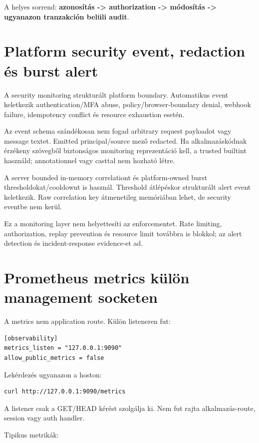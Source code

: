 A helyes sorrend: \textbf{azonosítás -> authorization -> módosítás -> ugyanazon tranzakción belüli audit}.

\section{Platform security event, redaction és burst alert}

A security monitoring strukturált platform boundary. Automatikus event keletkezik authentication/MFA abuse, policy/browser-boundary denial, webhook failure, idempotency conflict és resource exhaustion esetén.

Az event schema szándékosan nem fogad arbitrary request payloadot vagy message textet. Emitted principal/source mező redacted. Ha alkalmazáskódnak érzékeny szövegből biztonságos monitoring reprezentáció kell, a trusted  builtint használd;  annotationnel vagy casttal nem hozható létre.

A server bounded in-memory correlationt és platform-owned burst thresholdokat/cooldownt is használ. Threshold átlépéskor strukturált  alert event keletkezik. Raw correlation key átmenetileg memóriában lehet, de security eventbe nem kerül.

Ez a monitoring layer nem helyettesíti az enforcementet. Rate limiting, authorization, replay prevention és resource limit továbbra is blokkol; az alert detection és incident-response evidence-et ad.

\section{Prometheus metrics külön management socketen}

A metrics nem application route. Külön listeneren fut:

\begin{lstlisting}
[observability]
metrics_listen = "127.0.0.1:9090"
allow_public_metrics = false
\end{lstlisting}

Lekérdezés ugyanazon a hoston:

\begin{lstlisting}
curl http://127.0.0.1:9090/metrics
\end{lstlisting}

A listener csak a  GET/HEAD kérést szolgálja ki. Nem fut rajta alkalmazás-route, session vagy auth handler.

Tipikus metrikák:

